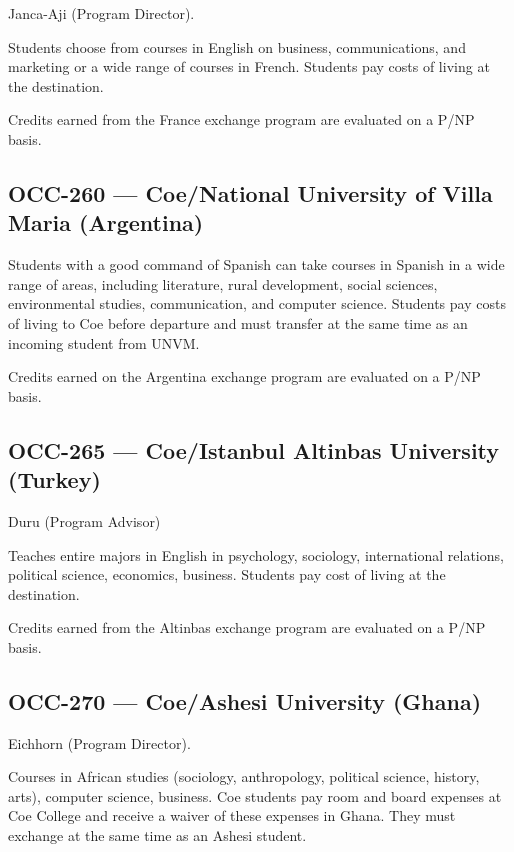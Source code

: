 \documentclass[
  letterpaper,
]{scrbook}
\begin{document}
Janca-Aji (Program Director).

Students choose from courses in English on business, communications, and
marketing or a wide range of courses in French. Students pay costs of
living at the destination.

Credits earned from the France exchange program are evaluated on a P/NP
basis.

\subsection{OCC-260 --- Coe/National University of Villa Maria
(Argentina)}\label{occ-260-coenational-university-of-villa-maria-argentina}

Students with a good command of Spanish can take courses in Spanish in a
wide range of areas, including literature, rural development, social
sciences, environmental studies, communication, and computer science.
Students pay costs of living to Coe before departure and must transfer
at the same time as an incoming student from UNVM.

Credits earned on the Argentina exchange program are evaluated on a P/NP
basis.

\subsection{OCC-265 --- Coe/Istanbul Altinbas University
(Turkey)}\label{occ-265-coeistanbul-altinbas-university-turkey}

Duru (Program Advisor)

Teaches entire majors in English in psychology, sociology, international
relations, political science, economics, business. Students pay cost of
living at the destination.

Credits earned from the Altinbas exchange program are evaluated on a
P/NP basis.

\subsection{OCC-270 --- Coe/Ashesi University
(Ghana)}\label{occ-270-coeashesi-university-ghana}

Eichhorn (Program Director).

Courses in African studies (sociology, anthropology, political science,
history, arts), computer science, business. Coe students pay room and
board expenses at Coe College and receive a waiver of these expenses in
Ghana. They must exchange at the same time as an Ashesi student.
\end{document}
